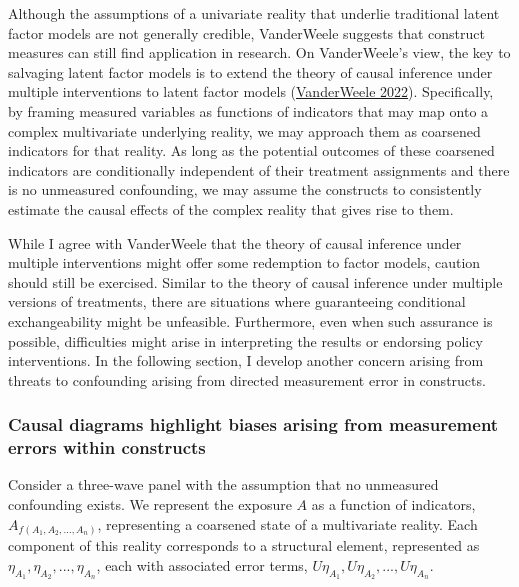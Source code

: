 \documentclass[
  singlecolumn]{article}
\begin{document}
Although the assumptions of a univariate reality that underlie
traditional latent factor models are not generally credible, VanderWeele
suggests that construct measures can still find application in research.
On VanderWeele's view, the key to salvaging latent factor models is to
extend the theory of causal inference under multiple interventions to
latent factor models
(\protect\hyperlink{ref-vanderweele2022}{VanderWeele 2022}).
Specifically, by framing measured variables as functions of indicators
that may map onto a complex multivariate underlying reality, we may
approach them as coarsened indicators for that reality. As long as the
potential outcomes of these coarsened indicators are conditionally
independent of their treatment assignments and there is no unmeasured
confounding, we may assume the constructs to consistently estimate the
causal effects of the complex reality that gives rise to them.

While I agree with VanderWeele that the theory of causal inference under
multiple interventions might offer some redemption to factor models,
caution should still be exercised. Similar to the theory of causal
inference under multiple versions of treatments, there are situations
where guaranteeing conditional exchangeability might be unfeasible.
Furthermore, even when such assurance is possible, difficulties might
arise in interpreting the results or endorsing policy interventions. In
the following section, I develop another concern arising from threats to
confounding arising from directed measurement error in constructs.

\hypertarget{causal-diagrams-highlight-biases-arising-from-measurement-errors-within-constructs}{%
\subsubsection{Causal diagrams highlight biases arising from measurement
errors within
constructs}\label{causal-diagrams-highlight-biases-arising-from-measurement-errors-within-constructs}}

Consider a three-wave panel with the assumption that no unmeasured
confounding exists. We represent the exposure \(A\) as a function of
indicators, \(A_{f(A_1, A_2, ..., A_n)}\), representing a coarsened
state of a multivariate reality. Each component of this reality
corresponds to a structural element, represented as
\(\eta_{A_1}, \eta_{A_2}, ..., \eta_{A_n}\), each with associated error
terms, \(U\eta_{A_1}, U\eta_{A_2}, ..., U\eta_{A_n}\).
\end{document}
